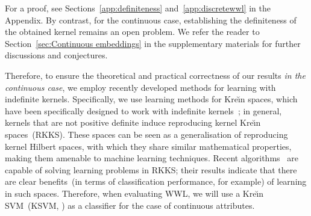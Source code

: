 \documentclass{article}
\begin{document}
For a proof, see Sections~\ref{app:definiteness} and~\ref{app:discretewwl} in the Appendix.
By contrast, for the continuous case, establishing the definiteness of the obtained kernel remains an open problem. We refer the reader to Section~\ref{sec:Continuous embeddings} in the supplementary materials for
further discussions and conjectures.



Therefore, to ensure the theoretical and practical correctness of our results \emph{in the continuous case}, we employ recently developed methods for learning with indefinite kernels. Specifically, we use learning methods for Kre\u{\i}n spaces, which have been specifically designed to work with indefinite kernels~\citep{ong2004learning}; in general, kernels that are not positive definite induce reproducing kernel Kre\u{\i}n spaces~(RKKS). These spaces can be seen as a generalisation of reproducing kernel Hilbert spaces, with which they share similar mathematical properties, making them amenable to machine learning techniques.
Recent algorithms~\citep{loosli2015learning, oglic2018learning} are capable of solving learning problems in RKKS; their results indicate that there are clear benefits~(in terms of classification performance, for example) of learning in such spaces.
Therefore, when evaluating WWL, we will use a Kre\u{\i}n SVM~(KSVM, \citep{loosli2015learning}) as a classifier for the case of continuous attributes.
\end{document}
